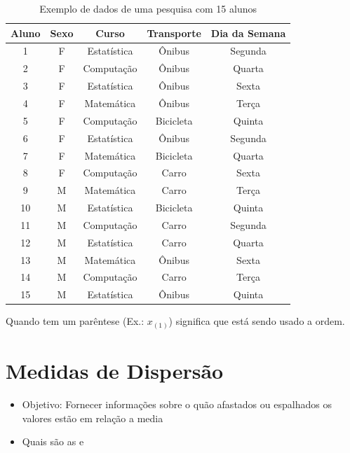 \documentclass[12pt]{article}
\begin{document}
    \begin{table}[H]
        \centering
        \caption{Exemplo de dados de uma pesquisa com 15 alunos}
        \vspace{8pt}
        \begin{tabular}{c|c|c|c|c}
            \hline
            \textbf{Aluno} & \textbf{Sexo} & \textbf{Curso} & \textbf{Transporte} & \textbf{Dia da Semana} \\ \hline
            1 & F & Estatística & Ônibus & Segunda \\
            2 & F & Computação & Ônibus & Quarta \\
            3 & F & Estatística & Ônibus & Sexta \\
            4 & F & Matemática & Ônibus & Terça \\
            5 & F & Computação & Bicicleta & Quinta \\
            6 & F & Estatística & Ônibus & Segunda \\
            7 & F & Matemática & Bicicleta & Quarta \\
            8 & F & Computação & Carro & Sexta \\
            9 & M & Matemática & Carro & Terça \\
            10 & M & Estatística & Bicicleta & Quinta \\
            11 & M & Computação & Carro & Segunda \\
            12 & M & Estatística & Carro & Quarta \\
            13 & M & Matemática & Ônibus & Sexta \\
            14 & M & Computação & Carro & Terça \\
            15 & M & Estatística & Ônibus & Quinta \\ \hline
        \end{tabular}
    \end{table}




Quando tem um parêntese (Ex.: $x_{(1)}$) significa que está sendo usado a ordem.


\section{Medidas de Dispersão}
\begin{itemize}
    \item Objetivo: Fornecer informações sobre o quão afastados ou espalhados 
    os valores estão em relação a media
    \item Quais são as e
\end{itemize}
\end{document}
